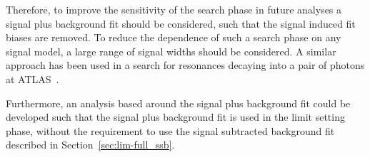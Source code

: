 Therefore, to improve the sensitivity of the search phase in future analyses
a signal plus background fit should be considered, such that the signal induced fit biases are removed.
To reduce the dependence of such a search phase on any signal model, a large range of signal widths should be considered. 
A similar approach has been used in a search for resonances decaying into a pair of photons at ATLAS~\cite{fut-diphoton}.

Furthermore, an analysis based around the signal plus background fit could be developed
such that the signal plus background fit is used in the limit setting phase,
without the requirement to use the signal subtracted background fit described in Section~\ref{sec:lim-full_ssb}.



